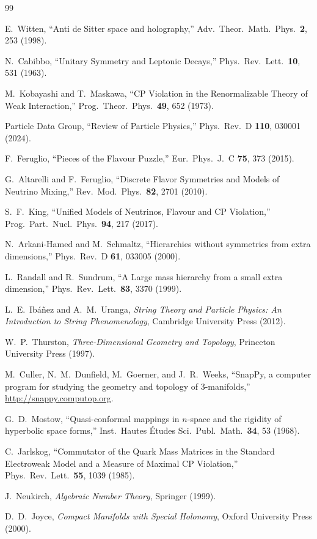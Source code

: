 \documentclass[12pt,prd,superscriptaddress,nofootinbib]{revtex4-2}
\begin{document}
\begin{thebibliography}{99}

E.~Witten,
``Anti de Sitter space and holography,''
Adv.\ Theor.\ Math.\ Phys.\ \textbf{2}, 253 (1998).

N.~Cabibbo,
``Unitary Symmetry and Leptonic Decays,''
Phys.\ Rev.\ Lett.\ \textbf{10}, 531 (1963).

M.~Kobayashi and T.~Maskawa,
``CP Violation in the Renormalizable Theory of Weak Interaction,''
Prog.\ Theor.\ Phys.\ \textbf{49}, 652 (1973).

Particle Data Group,
``Review of Particle Physics,''
Phys.\ Rev.\ D \textbf{110}, 030001 (2024).

F.~Feruglio,
``Pieces of the Flavour Puzzle,''
Eur.\ Phys.\ J.\ C \textbf{75}, 373 (2015).

G.~Altarelli and F.~Feruglio,
``Discrete Flavor Symmetries and Models of Neutrino Mixing,''
Rev.\ Mod.\ Phys.\ \textbf{82}, 2701 (2010).

S.~F.~King,
``Unified Models of Neutrinos, Flavour and CP Violation,''
Prog.\ Part.\ Nucl.\ Phys.\ \textbf{94}, 217 (2017).

N.~Arkani-Hamed and M.~Schmaltz,
``Hierarchies without symmetries from extra dimensions,''
Phys.\ Rev.\ D \textbf{61}, 033005 (2000).

L.~Randall and R.~Sundrum,
``A Large mass hierarchy from a small extra dimension,''
Phys.\ Rev.\ Lett.\ \textbf{83}, 3370 (1999).

L.~E.~Ib\'a\~nez and A.~M.~Uranga,
\emph{String Theory and Particle Physics: An Introduction to String Phenomenology},
Cambridge University Press (2012).

W.~P.~Thurston,
\emph{Three-Dimensional Geometry and Topology},
Princeton University Press (1997).

M.~Culler, N.~M.~Dunfield, M.~Goerner, and J.~R.~Weeks,
``SnapPy, a computer program for studying the geometry and topology 
of 3-manifolds,''
\url{http://snappy.computop.org}.

G.~D.~Mostow,
``Quasi-conformal mappings in $n$-space and the rigidity of hyperbolic 
space forms,''
Inst.\ Hautes \'Etudes Sci.\ Publ.\ Math.\ \textbf{34}, 53 (1968).

C.~Jarlskog,
``Commutator of the Quark Mass Matrices in the Standard Electroweak 
Model and a Measure of Maximal CP Violation,''
Phys.\ Rev.\ Lett.\ \textbf{55}, 1039 (1985).

J.~Neukirch,
\emph{Algebraic Number Theory},
Springer (1999).

D.~D.~Joyce,
\emph{Compact Manifolds with Special Holonomy},
Oxford University Press (2000).

\end{thebibliography}
\end{document}
